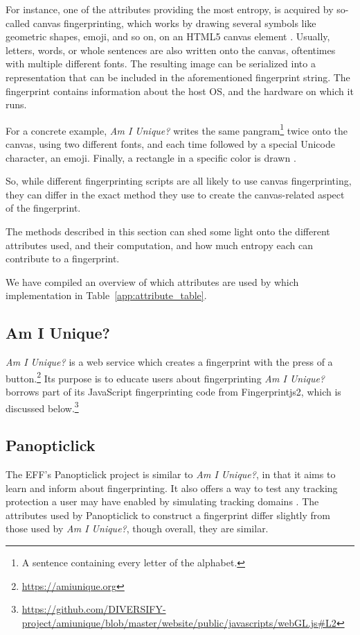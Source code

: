\documentclass[
    fontsize=12pt,
    headings=small,
    parskip=half,
    bibliography=totoc,
    numbers=noenddot,
    open=any
    ]{scrreprt}
\begin{document}
For instance, one of the attributes providing the most entropy, is acquired by so-called canvas fingerprinting, which works by drawing
several symbols like geometric shapes, emoji, and so on, on an HTML5 canvas element \cite{laperdrix2016beauty}.
Usually, letters, words, or whole sentences are also written onto the canvas, oftentimes with multiple different fonts.
The resulting image can be serialized into a representation that can be included in the aforementioned fingerprint string.
The fingerprint contains information about the host OS, and the hardware on which it runs.

For a concrete example, \textit{Am I Unique?} writes the same pangram\footnote{A sentence containing every letter of the alphabet.}
twice onto the canvas, using two different fonts, and each time followed by a special Unicode character, an emoji.
Finally, a rectangle in a specific color is drawn \cite{laperdrix2016beauty}.

So, while different fingerprinting scripts are all likely to use canvas fingerprinting, they can differ in the exact
method they use to create the canvas-related aspect of the fingerprint.

The methods described in this section can shed some light onto the different attributes used, and their computation,
and how much entropy each can contribute to a fingerprint.

We have compiled an overview of which attributes are used by which implementation in Table~\ref{app:attribute_table}.


\subsection{Am I Unique?}
\label{related_work:am_i_unique}
\textit{Am I Unique?} \cite{laperdrix2016beauty} is a web service which creates
a fingerprint with the press of a button.\footnote{\url{https://amiunique.org}}
Its purpose is to educate users about fingerprinting
\textit{Am I Unique?} borrows part of its JavaScript fingerprinting code from
Fingerprintjs2, which is discussed below.\footnote{\url{https://github.com/DIVERSIFY-project/amiunique/blob/master/website/public/javascripts/webGL.js\#L2}}


\subsection{Panopticlick}
\label{related_work:panopticlick}
The EFF's Panopticlick project is similar to \textit{Am I Unique?}, in that it aims to learn and inform about
fingerprinting. It also offers a way to test any tracking protection a user may have enabled by simulating
tracking domains \cite{panopticlick}. The attributes used by Panopticlick to construct a fingerprint differ slightly from those used by
\textit{Am I Unique?}, though overall, they are similar.
\end{document}
